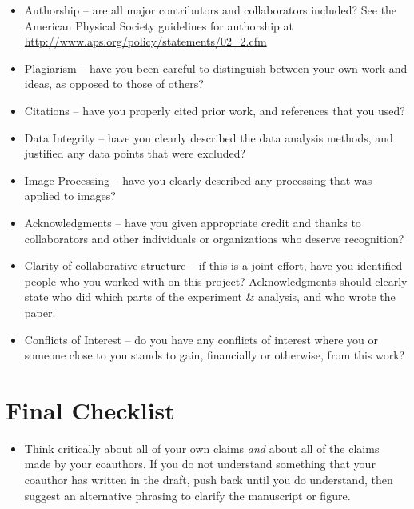 \documentclass[aps,prb,twocolumn,superscriptaddress,floatfix,longbibliography]{revtex4-2}
\begin{document}
\begin{itemize}[label=$\Box$]
\item Authorship -- are all major contributors and collaborators included? See the American Physical Society guidelines for authorship at
{\url{http://www.aps.org/policy/statements/02_2.cfm}}

\item Plagiarism -- have you been careful to distinguish between your own work and ideas, as opposed to those of others?

\item Citations -- have you properly cited prior work, and references that you used?

\item Data Integrity -- have you clearly described the data analysis methods, and justified any data points that were excluded?

\item Image Processing -- have you clearly described any processing that was applied to images?

\item Acknowledgments -- have you given appropriate credit and thanks to collaborators and other individuals or organizations who deserve recognition?

\item Clarity of collaborative structure -- if this is a joint effort, have you identified people who you worked with on this project? Acknowledgments should clearly state who did which parts of the experiment \& analysis, and who wrote the paper.

\item Conflicts of Interest -- do you have any conflicts of interest where you or someone close to you stands to gain, financially or otherwise, from this work?
\end{itemize}

\section{\label{sec:Conclusion}Final Checklist}

\begin{itemize}[label=$\Box$]
\item Think critically about all of your own claims {\em and} about all of the claims made by your coauthors. If you do not understand something that your coauthor has written in the draft, push back until you do understand, then suggest an alternative phrasing to clarify the manuscript or figure.
\end{itemize}
\end{document}
